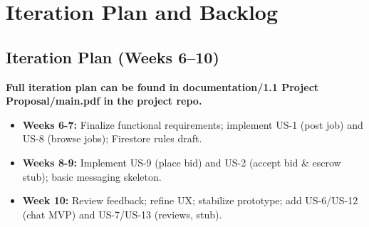 \documentclass[11pt]{article}
\begin{document}
\section{Iteration Plan and Backlog}

\subsection{Iteration Plan (Weeks 6--10)}
\textbf{Full iteration plan can be found in documentation/1.1 Project Proposal/main.pdf in the project repo.}
\begin{itemize}[leftmargin=1.4em]
  \item \textbf{Weeks 6-7:} Finalize functional requirements; implement US-1 (post job) and US-8 (browse jobs); Firestore rules draft.
  \item \textbf{Weeks 8-9:} Implement US-9 (place bid) and US-2 (accept bid \& escrow stub); basic messaging skeleton.
  \item \textbf{Week 10:} Review feedback; refine UX; stabilize prototype; add US-6/US-12 (chat MVP) and US-7/US-13 (reviews, stub).
\end{itemize}
\end{document}
